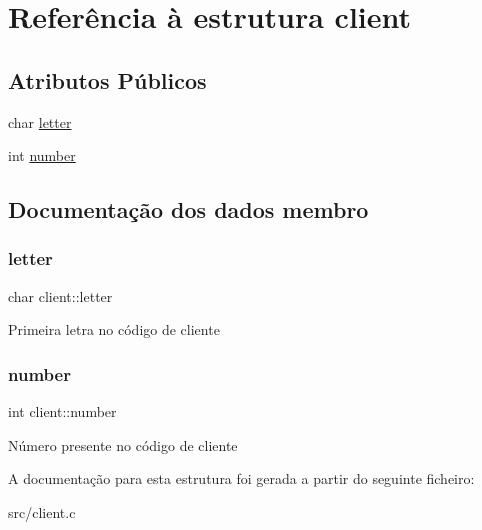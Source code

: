 \hypertarget{structclient}{}\section{Referência à estrutura client}
\label{structclient}
\subsection*{Atributos Públicos}
\begin{DoxyCompactItemize}
\item 
char \hyperlink{structclient_a162e6e856916114d2a8ca9f644a66a51}{letter}
\item 
int \hyperlink{structclient_ac3e6b567e96cdb4b51c5a48c7c71c442}{number}
\end{DoxyCompactItemize}


\subsection{Documentação dos dados membro}
\mbox{\label{structclient_a162e6e856916114d2a8ca9f644a66a51}} 
\subsubsection{\texorpdfstring{letter}{letter}}
{\footnotesize\ttfamily char client\+::letter}

Primeira letra no código de cliente \mbox{\label{structclient_ac3e6b567e96cdb4b51c5a48c7c71c442}} 
\subsubsection{\texorpdfstring{number}{number}}
{\footnotesize\ttfamily int client\+::number}

Número presente no código de cliente 

A documentação para esta estrutura foi gerada a partir do seguinte ficheiro\+:\begin{DoxyCompactItemize}
\item 
src/client.\+c\end{DoxyCompactItemize}
